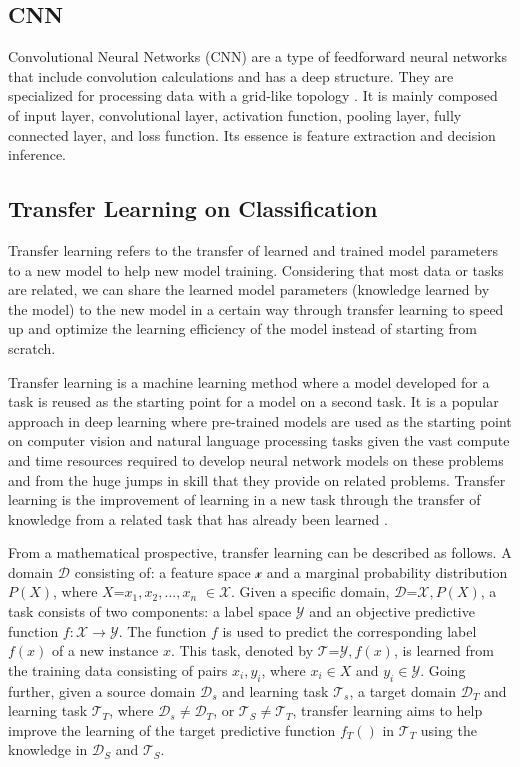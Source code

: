 \documentclass[conference]{IEEEtran}
\begin{document}
\subsection{CNN}
Convolutional Neural Networks (CNN) are a type of feedforward neural networks that include convolution calculations and has a deep structure. They are specialized for processing data with a grid-like topology \cite{goodfellow-deep}. It is mainly composed of input layer, convolutional layer, activation function, pooling layer, fully connected layer, and loss function. Its essence is feature extraction and decision inference. 



\subsection{Transfer Learning on Classification}
\label{transfer}
Transfer learning refers to the transfer of learned and trained model parameters to a new model to help new model training. Considering that most data or tasks are related, we can share the learned model parameters (knowledge learned by the model) to the new model in a certain way through transfer learning to speed up and optimize the learning efficiency of the model instead of starting from scratch.

Transfer learning is a machine learning method where a model developed for a task is reused as the starting point for a model on a second task. It is a popular approach in deep learning where pre-trained models are used as the starting point on computer vision and natural language processing tasks given the vast compute and time resources required to develop neural network models on these problems and from the huge jumps in skill that they provide on related problems. Transfer learning is the improvement of learning in a new task through the transfer of knowledge from a related task that has already been learned \cite{olivas-handbook}.

From a mathematical prospective, transfer learning can be described as follows. A domain $\mathcal D$ consisting of: a feature space $\mathcal x$ and a marginal probability distribution $P(X)$, where $X$={$x_1,x_2,...,x_n$} $\in \mathcal X$. Given a specific domain, $\mathcal D$={$\mathcal X,P(X)$}, a task consists of two components: a label space $\mathcal Y$ and an objective predictive function $f:\mathcal X \to \mathcal Y$. The function $f$ is used to predict the corresponding label $f(x)$ of a new instance $x$. This task, denoted by $\mathcal T$={$\mathcal Y,f(x)$}, is learned from the training data consisting of pairs {$x_i,y_i$}, where $x_i \in X$ and $y_i \in \mathcal Y$. Going further, given a source domain $\mathcal D_s$ and learning task $\mathcal T_s$, a target domain $\mathcal D_T$ and learning task $\mathcal T_T$, where $\mathcal D_s \neq \mathcal D_T$, or $\mathcal T_S \neq \mathcal T_T$, transfer learning aims to help improve the learning of the target predictive function $f_T()$ in $\mathcal T_T$ using the knowledge in $\mathcal D_S$ and $\mathcal T_S$.  
\end{document}
